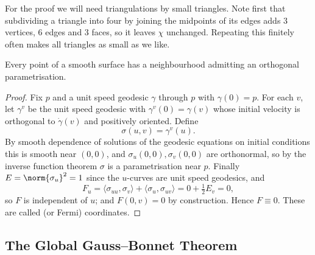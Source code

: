 \documentclass[a4paper]{scrartcl}
\begin{document}
For the proof we will need triangulations by small triangles. Note first that subdividing a triangle into four by joining the midpoints of its edges adds $3$ vertices, $6$ edges and $3$ faces, so it leaves $\chi$ unchanged. Repeating this finitely often makes all triangles as small as we like.

\begin{proposition}
    Every point of a smooth surface has a neighbourhood admitting an orthogonal parametrisation.
\end{proposition}
\begin{proof}
    Fix $p$ and a unit speed geodesic $\gamma$ through $p$ with $\gamma(0) = p$. For each $v$, let $\gamma^v$ be the unit speed geodesic with $\gamma^v(0) = \gamma(v)$ whose initial velocity is orthogonal to $\dot\gamma(v)$ and positively oriented. Define
    $$
    \sigma(u,v) = \gamma^v(u).
    $$
    By smooth dependence of solutions of the geodesic equations on initial conditions this is smooth near $(0,0)$, and $\sigma_u(0,0), \sigma_v(0,0)$ are orthonormal, so by the inverse function theorem $\sigma$ is a parametrisation near $p$. Finally $E = \norm{\sigma_u}^2 = 1$ since the $u$-curves are unit speed geodesics, and
    $$
    F_u = \langle \sigma_{uu},\sigma_v\rangle + \langle \sigma_u,\sigma_{uv}\rangle = 0 + \tfrac12 E_v = 0,
    $$
    so $F$ is independent of $u$; and $F(0,v) = 0$ by construction. Hence $F \equiv 0$. These are called  (or Fermi) coordinates.
\end{proof}

\subsection{The Global Gauss--Bonnet Theorem}
\end{document}
